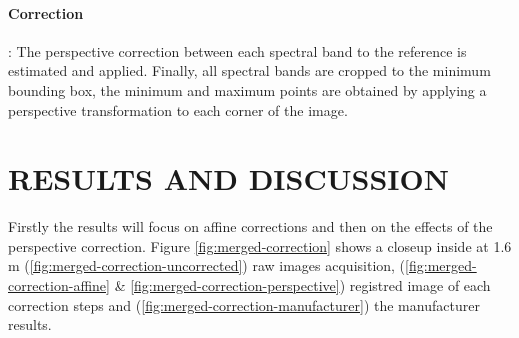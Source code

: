 \documentclass[a4paper,twoside]{article}
\begin{document}
	
	\paragraph{Correction} :
	The perspective correction between each spectral band to the reference is estimated and applied.
	Finally, all spectral bands are cropped to the minimum bounding box,
	the minimum and maximum points are obtained by applying a perspective transformation to each corner of the image.
	
	
	\section{\uppercase{Results and discussion}}
	
	Firstly the results will focus on affine corrections and then on the effects of the perspective correction.
	Figure \ref{fig:merged-correction} shows a closeup inside at 1.6 m (\ref{fig:merged-correction-uncorrected}) raw images acquisition,
	(\ref{fig:merged-correction-affine} \& \ref{fig:merged-correction-perspective}) registred image of each correction steps
	and (\ref{fig:merged-correction-manufacturer}) the manufacturer results.
	
\end{document}
